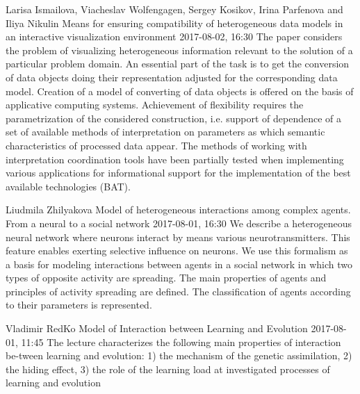\documentclass[10pt,fleqn,openany]{book} %
\begin{document}
\begin{enumerate}
		
		\paperabstract
		{Larisa Ismailova, Viacheslav Wolfengagen, Sergey Kosikov, Irina Parfenova and Iliya Nikulin}
		{Means for ensuring compatibility of heterogeneous data models in an interactive visualization environment}
		{2017-08-02, 16:30}
		{The paper considers the problem of visualizing heterogeneous information relevant to the solution of a particular problem domain. An essential part of the task is to get the conversion of data objects doing their representation adjusted for the corresponding data model. Creation of a model of converting of data objects is offered on the basis of applicative computing systems. Achievement of flexibility requires the parametrization of the considered construction, i.e. support of dependence of a set of available methods of interpretation on parameters as which semantic characteristics of processed data appear. The methods of working with interpretation coordination tools have been partially tested when implementing various applications for informational support for the implementation of the best available technologies (BAT).}
		
		
		\paperabstract
		{Liudmila Zhilyakova}
		{Model of heterogeneous interactions among complex agents. From a neural to a social network}
		{2017-08-01, 16:30}
		{We describe a heterogeneous neural network where neurons interact by means various neurotransmitters. This feature enables exerting selective influence on neurons. We use this formalism as a basis for modeling interactions between agents in a social network in which two types of opposite activity are spreading. The main properties of agents and principles of activity spreading are defined. The classification of agents according to their parameters is represented.}
		
		
		\paperabstract
		{Vladimir RedKo}
		{Model of Interaction between Learning and Evolution}
		{2017-08-01, 11:45}
		{The lecture characterizes the following main properties of interaction be-tween learning and evolution: 1) the mechanism of the genetic assimilation, 2) the hiding effect, 3) the role of the learning load at investigated processes of learning and evolution}
		

\end{enumerate}
\end{document}
